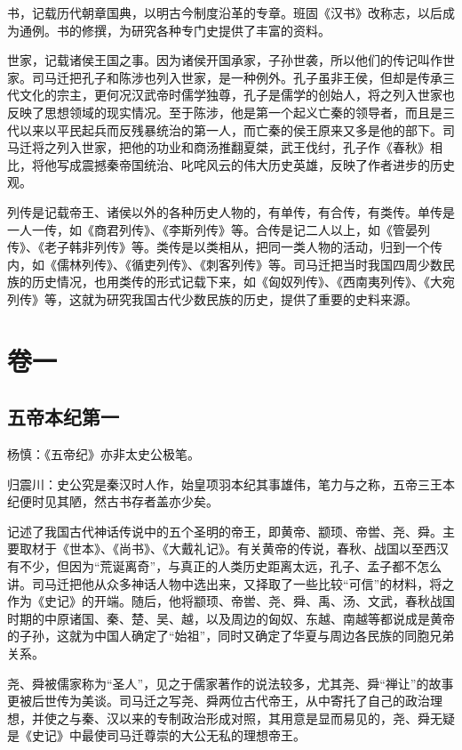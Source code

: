\documentclass[12pt,UTF8]{ctexbook}
\begin{document}
书，记载历代朝章国典，以明古今制度沿革的专章。班固《汉书》改称志，以后成为通例。书的修撰，为研究各种专门史提供了丰富的资料。

世家，记载诸侯王国之事。因为诸侯开国承家，子孙世袭，所以他们的传记叫作世家。司马迁把孔子和陈涉也列入世家，是一种例外。孔子虽非王侯，但却是传承三代文化的宗主，更何况汉武帝时儒学独尊，孔子是儒学的创始人，将之列入世家也反映了思想领域的现实情况。至于陈涉，他是第一个起义亡秦的领导者，而且是三代以来以平民起兵而反残暴统治的第一人，而亡秦的侯王原来又多是他的部下。司马迁将之列入世家，把他的功业和商汤推翻夏桀，武王伐纣，孔子作《春秋》相比，将他写成震撼秦帝国统治、叱咤风云的伟大历史英雄，反映了作者进步的历史观。

列传是记载帝王、诸侯以外的各种历史人物的，有单传，有合传，有类传。单传是一人一传，如《商君列传》、《李斯列传》等。合传是记二人以上，如《管晏列传》、《老子韩非列传》等。类传是以类相从，把同一类人物的活动，归到一个传内，如《儒林列传》、《循吏列传》、《刺客列传》等。司马迁把当时我国四周少数民族的历史情况，也用类传的形式记载下来，如《匈奴列传》、《西南夷列传》、《大宛列传》等，这就为研究我国古代少数民族的历史，提供了重要的史料来源。

\mainmatter

\part{卷一}

\chapter{五帝本纪第一}

杨慎：《五帝纪》亦非太史公极笔。

归震川：史公究是秦汉时人作，始皇项羽本纪其事雄伟，笔力与之称，五帝三王本纪便时见其陋，然古书存者盖亦少矣。

记述了我国古代神话传说中的五个圣明的帝王，即黄帝、颛顼、帝喾、尧、舜。主要取材于《世本》、《尚书》、《大戴礼记》。有关黄帝的传说，春秋、战国以至西汉有不少，但因为“荒诞离奇”，与真正的人类历史距离太远，孔子、孟子都不怎么讲。司马迁把他从众多神话人物中选出来，又择取了一些比较“可信”的材料，将之作为《史记》的开端。随后，他将颛顼、帝喾、尧、舜、禹、汤、文武，春秋战国时期的中原诸国、秦、楚、吴、越，以及周边的匈奴、东越、南越等都说成是黄帝的子孙，这就为中国人确定了“始祖”，同时又确定了华夏与周边各民族的同胞兄弟关系。

尧、舜被儒家称为“圣人”，见之于儒家著作的说法较多，尤其尧、舜“禅让”的故事更被后世传为美谈。司马迁之写尧、舜两位古代帝王，从中寄托了自己的政治理想，并使之与秦、汉以来的专制政治形成对照，其用意是显而易见的，尧、舜无疑是《史记》中最使司马迁尊崇的大公无私的理想帝王。
\end{document}
